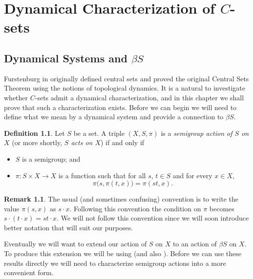 \documentclass[12pt]{article}
\theoremstyle{plain}
\theoremstyle{definition}
\newtheorem{defn}[thm]{Definition}
\newtheorem{rmk}[thm]{Remark}
\begin{document}
\chapter{Dynamical Characterization of $C$-sets}
\section{Dynamical Systems and $\beta S$}
Furstenburg in \cite[Chapter 8]{Furstenberg:1981fk} originally defined central sets and proved the original Central Sets Theorem using the notions of topological dynamics. 
It is a natural to investigate whether $C$-sets admit a dynamical characterization, and in this chapter we shall prove that such a characterization exists.
Before we can begin we will need to define what we mean by a dynamical
system and provide a connection to $\beta S$.
  \begin{defn}
    \label{defn:semiact}
    Let $S$ be a set. 
    A triple $(X, S, \pi)$ is a \textsl{semigroup action of $S$ on
      $X$} (or more shortly, \textsl{$S$ acts on $X$}) if and only if 
      \begin{itemize}
        \item[(1)] $S$ is a semigroup; and
        
        \item[(2)] $\pi : S \times X \to X$ is a function such that
          for all $s$, $t \in S$ and for every $x \in X$,
          \[ \pi\bigl(s, \pi(t,x)\bigr) = \pi(st, x). \]
      \end{itemize}
  \end{defn}
  
  \begin{rmk}
    The usual (and sometimes confusing) convention is to write the value
    $\pi(s,x)$ as $s \cdot x$.
    Following this convention the condition on $\pi$ becomes $s \cdot (t
    \cdot x) = st \cdot x$.
    We will not follow this convention since we will soon introduce
    better notation that will suit our purposes.
  \end{rmk}

Eventually we will want to extend our action of $S$ on $X$ to an
action of $\beta S$ on $X$.
To produce this extension we will be using \cite[Lemma
3.30]{Hindman:1998fk} (and also \cite[Corollary
4.22]{Hindman:1998fk}). 
Before we can use these results directly we will need to characterize
semigroup actions into a more convenient form. 
\end{document}

